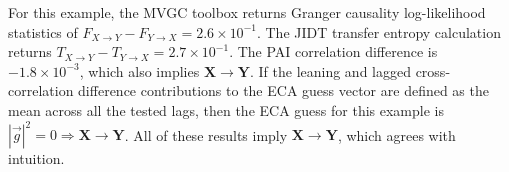 
For this example, the MVGC toolbox returns Granger causality log-likelihood statistics of $F_{X\rightarrow Y}-F_{Y\rightarrow X}=2.6\times 10^{-1}$.  The JIDT transfer entropy calculation returns $T_{X\rightarrow Y}-T_{Y\rightarrow X}=2.7\times 10^{-1}$.  The PAI correlation difference is $-1.8\times 10^{-3}$, which also implies $\mathbf{X}\rightarrow\mathbf{Y}$.  If the leaning and lagged cross-correlation difference contributions to the ECA guess vector are defined as the mean across all the tested lags, then the ECA guess for this example is $|\vec{g}|^2=0\Rightarrow \mathbf{X}\rightarrow\mathbf{Y}$.  All of these results imply $\mathbf{X}\rightarrow\mathbf{Y}$, which agrees with intuition.    

